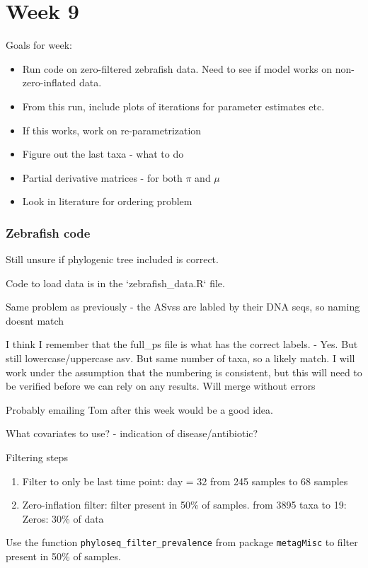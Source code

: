 \documentclass[10pt]{article}
\begin{document}
\section{Week 9}

Goals for week:
\begin{itemize}
  \item Run code on zero-filtered zebrafish data. Need to see if model works on non-zero-inflated data.
  \item From this run, include plots of iterations for parameter estimates etc.
  \item If this works, work on re-parametrization
  \item Figure out the last taxa - what to do
  \item Partial derivative matrices - for both $\pi$ and $\mu$
  \item Look in literature for ordering problem
\end{itemize}

\subsubsection*{Zebrafish code}

Still unsure if phylogenic tree included is correct.

Code to load data is in the `zebrafish\_data.R` file.

Same problem as previously - the ASvss are labled by their DNA seqs, so naming doesnt match

I think I remember that the full\_ps file is what has the correct labels. - Yes. But still lowercase/uppercase asv. But same number of taxa, so a likely match. I will work under the assumption that the numbering is consistent, but this will need to be verified before we can rely on any results. Will merge without errors

Probably emailing Tom after this week would be a good idea.

What covariates to use? - indication of disease/antibiotic?

Filtering steps
\begin{enumerate}
  \item Filter to only be last time point: day = 32 from 245 samples to 68 samples
  \item Zero-inflation filter: filter present in 50\% of samples.  from 3895 taxa to 19: Zeros: 30\% of data
\end{enumerate}

Use the function \texttt{phyloseq\_filter\_prevalence} from package \texttt{metagMisc} to filter present in 50\% of samples.
\end{document}
